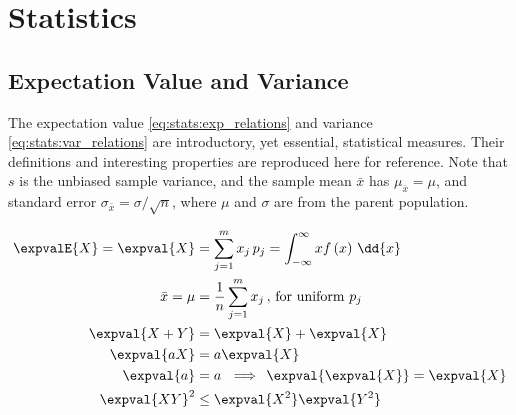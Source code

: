 \chapter{Statistics}
\label{chap:stats}

\section{Expectation Value and Variance}
\label{stats:expval_and_var}

The expectation value \cref{eq:stats:exp_relations} and variance \cref{eq:stats:var_relations} are introductory, yet essential, statistical measures.
Their definitions and interesting properties are reproduced here for reference.
Note that $s$ is the unbiased sample variance,
and the sample mean $\bar{x}$ has $\mu_{\bar{x}} = \mu$, and standard error $\sigma_{\bar{x}} = \sigma / \sqrt{n}$,
where $\mu$ and $\sigma$ are from the parent population.

\begin{subequations}\label{eq:stats:exp_relations}
\begin{align}
\expvalE{X} = \expval{X} &= \sum_{j=1}^{m} x_{j} \, p_{j} = \int_{-\infty}^{\infty} x f\left(x\right) \, \dd{x} \label{eq:stats:exp_relations:def} \\
\bar{x} = \mu &= \frac{1}{n} \sum_{j=1}^{m} x_{j}\,,\,\text{for uniform}~p_{j} \label{eq:stats:exp_relations:mean} \\
\expval{X+Y} &= \expval{X} + \expval{X} \label{eq:stats:exp_relations:add} \\
\expval{a X} &= a \expval{X} \label{eq:stats:exp_relations:mult} \\
\expval{a} &= a \,\, \implies \, \expval{\expval{X}} = \expval{X} \label{eq:stats:exp_relations:self} \\
\expval{X Y}^{2} &\leq \expval{X^{2}} \expval{Y^{2}} \label{eq:stats:exp_relations:cbs_ineq}
\end{align}
\end{subequations}

